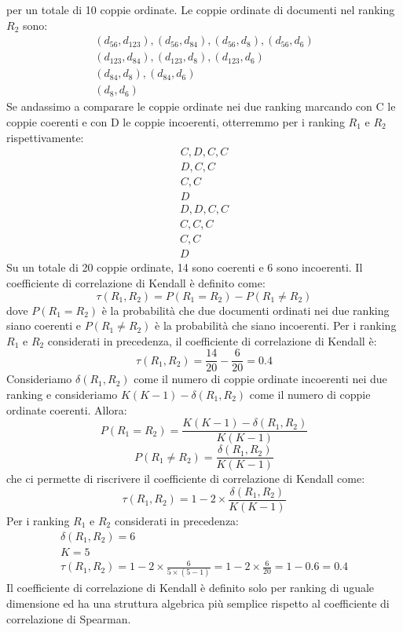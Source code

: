 \documentclass{report}
\begin{document}
	per un totale di 10 coppie ordinate. Le coppie ordinate di documenti nel ranking $R_2$ sono:
	\[
		\begin{array}{l}
			(d_56, d_123), (d_56, d_84), (d_56, d_8), (d_56, d_6) \\
			(d_123, d_84), (d_123, d_8), (d_123, d_6) \\
			(d_84, d_8), (d_84, d_6) \\
			(d_8, d_6)
		\end{array}
	\]
	Se andassimo a comparare le coppie ordinate nei due ranking marcando con C le coppie coerenti e con D le coppie incoerenti, otterremmo per i ranking $R_1$ e $R_2$ rispettivamente:
	\[
		\begin{array}{l}
			C, D, C, C\\
			D, C, C\\
			C, C\\
			D
		\end{array}
	\]
	\[
		\begin{array}{l}
			D, D, C, C\\
			C, C, C\\
			C, C\\
			D
		\end{array}
	\]
	Su un totale di 20 coppie ordinate, 14 sono coerenti e 6 sono incoerenti. Il coefficiente di correlazione di Kendall è definito come:
	\[
		\tau(R_1, R_2) = P(R_1 = R_2) - P(R_1 \neq R_2)
	\]
	dove $P(R_1 = R_2)$ è la probabilità che due documenti ordinati nei due ranking siano coerenti e $P(R_1 \neq R_2)$ è la probabilità che siano incoerenti. Per i ranking $R_1$ e $R_2$ considerati in precedenza, il coefficiente di correlazione di Kendall è:
	\[
		\tau(R_1, R_2) = \frac{14}{20} - \frac{6}{20} = 0.4
	\]
	Consideriamo $\delta(R_1, R_2)$ come il numero di coppie ordinate incoerenti nei due ranking e consideriamo $K(K-1) - \delta(R_1, R_2)$ come il numero di coppie ordinate coerenti. Allora:
	\[
		P(R_1 = R_2) = \frac{K(K-1) - \delta(R_1, R_2)}{K(K-1)}
	\]
	\[
		P(R_1 \neq R_2) = \frac{\delta(R_1, R_2)}{K(K-1)}
	\]
	che ci permette di riscrivere il coefficiente di correlazione di Kendall come:
	\[
		\tau(R_1, R_2) = 1 - 2 \times \frac{\delta(R_1, R_2)}{K(K-1)}
	\]
	Per i ranking $R_1$ e $R_2$ considerati in precedenza:
	\[
		\begin{array}{l}
			\delta(R_1, R_2) = 6\\
			K = 5 \\
			\tau(R_1, R_2) = 1 - 2 \times \frac{6}{5 \times (5-1)} = 1 - 2 \times \frac{6}{20} = 1 - 0.6 = 0.4
		\end{array}
	\]
	Il coefficiente di correlazione di Kendall è definito solo per ranking di uguale dimensione ed ha una struttura algebrica più semplice rispetto al coefficiente di correlazione di Spearman.
\end{document}
